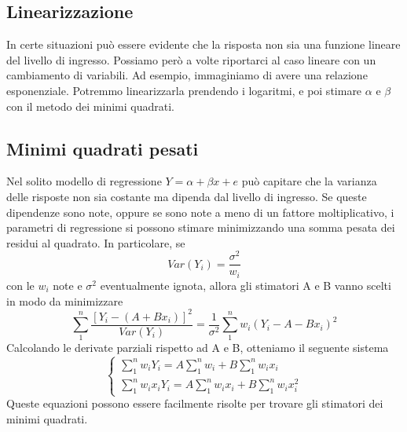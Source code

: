 \documentclass[11pt]{article}
\begin{document}
\subsection{Linearizzazione}
In certe situazioni può essere evidente che la risposta non sia una funzione lineare del livello di ingresso. Possiamo però a volte riportarci al caso lineare con un cambiamento di variabili. Ad esempio, immaginiamo di avere una relazione esponenziale. Potremmo linearizzarla prendendo i logaritmi, e poi stimare $\alpha$ e $\beta$ con il metodo dei minimi quadrati. 
\subsection{Minimi quadrati pesati}
Nel solito modello di regressione $Y=\alpha+\beta x + e$ può capitare che la varianza delle risposte non sia costante ma dipenda dal livello di ingresso. Se queste dipendenze sono note, oppure se sono note a meno di un fattore moltiplicativo, i parametri di regressione si possono stimare minimizzando una somma pesata dei residui al quadrato. In particolare, se
\begin{displaymath}
    Var(Y_i) = \frac{\sigma^2}{w_i}
\end{displaymath}
con le $w_i$ note e $\sigma^2$ eventualmente ignota, allora gli stimatori A e B vanno scelti in modo da minimizzare 
\begin{displaymath}
    \sum_1^n \frac{[Y_i-(A+Bx_i)]^2}{Var(Y_i)} = \frac{1}{\sigma^2}\sum_1^n w_i(Y_i-A-Bx_i)^2
\end{displaymath}
Calcolando le derivate parziali rispetto ad A e B, otteniamo il seguente sistema
\begin{displaymath}
    \begin{cases}
        \sum_1^n w_iY_i = A\sum_1^n w_i + B \sum_1^n w_i x_i\\ 
        \sum_1^n w_i x_i Y_i = A\sum_1^n w_ix_i + B\sum_1^nw_ix_i^2
    \end{cases}
\end{displaymath}
Queste equazioni possono essere facilmente risolte per trovare gli stimatori dei minimi quadrati. 
\end{document}
